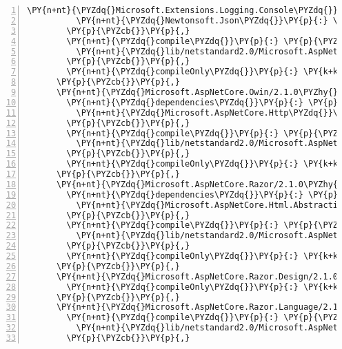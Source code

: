 \begin{Verbatim}[commandchars=\\\{\},numbers=left,firstnumber=1,stepnumber=1,numberblanklines=0]
          \PY{n+nt}{\PYZdq{}Microsoft.Extensions.Logging.Console\PYZdq{}}\PY{p}{:} \PY{l+s+s2}{\PYZdq{}2.1.0\PYZhy{}rc1\PYZhy{}final\PYZdq{}}\PY{p}{,}
          \PY{n+nt}{\PYZdq{}Newtonsoft.Json\PYZdq{}}\PY{p}{:} \PY{l+s+s2}{\PYZdq{}11.0.2\PYZdq{}}
        \PY{p}{\PYZcb{}}\PY{p}{,}
        \PY{n+nt}{\PYZdq{}compile\PYZdq{}}\PY{p}{:} \PY{p}{\PYZob{}}
          \PY{n+nt}{\PYZdq{}lib/netstandard2.0/Microsoft.AspNetCore.NodeServices.dll\PYZdq{}}\PY{p}{:} \PY{p}{\PYZob{}}\PY{p}{\PYZcb{}}
        \PY{p}{\PYZcb{}}\PY{p}{,}
        \PY{n+nt}{\PYZdq{}compileOnly\PYZdq{}}\PY{p}{:} \PY{k+kc}{true}
      \PY{p}{\PYZcb{}}\PY{p}{,}
      \PY{n+nt}{\PYZdq{}Microsoft.AspNetCore.Owin/2.1.0\PYZhy{}rc1\PYZhy{}final\PYZdq{}}\PY{p}{:} \PY{p}{\PYZob{}}
        \PY{n+nt}{\PYZdq{}dependencies\PYZdq{}}\PY{p}{:} \PY{p}{\PYZob{}}
          \PY{n+nt}{\PYZdq{}Microsoft.AspNetCore.Http\PYZdq{}}\PY{p}{:} \PY{l+s+s2}{\PYZdq{}2.1.0\PYZhy{}rc1\PYZhy{}final\PYZdq{}}
        \PY{p}{\PYZcb{}}\PY{p}{,}
        \PY{n+nt}{\PYZdq{}compile\PYZdq{}}\PY{p}{:} \PY{p}{\PYZob{}}
          \PY{n+nt}{\PYZdq{}lib/netstandard2.0/Microsoft.AspNetCore.Owin.dll\PYZdq{}}\PY{p}{:} \PY{p}{\PYZob{}}\PY{p}{\PYZcb{}}
        \PY{p}{\PYZcb{}}\PY{p}{,}
        \PY{n+nt}{\PYZdq{}compileOnly\PYZdq{}}\PY{p}{:} \PY{k+kc}{true}
      \PY{p}{\PYZcb{}}\PY{p}{,}
      \PY{n+nt}{\PYZdq{}Microsoft.AspNetCore.Razor/2.1.0\PYZhy{}rc1\PYZhy{}final\PYZdq{}}\PY{p}{:} \PY{p}{\PYZob{}}
        \PY{n+nt}{\PYZdq{}dependencies\PYZdq{}}\PY{p}{:} \PY{p}{\PYZob{}}
          \PY{n+nt}{\PYZdq{}Microsoft.AspNetCore.Html.Abstractions\PYZdq{}}\PY{p}{:} \PY{l+s+s2}{\PYZdq{}2.1.0\PYZhy{}rc1\PYZhy{}final\PYZdq{}}
        \PY{p}{\PYZcb{}}\PY{p}{,}
        \PY{n+nt}{\PYZdq{}compile\PYZdq{}}\PY{p}{:} \PY{p}{\PYZob{}}
          \PY{n+nt}{\PYZdq{}lib/netstandard2.0/Microsoft.AspNetCore.Razor.dll\PYZdq{}}\PY{p}{:} \PY{p}{\PYZob{}}\PY{p}{\PYZcb{}}
        \PY{p}{\PYZcb{}}\PY{p}{,}
        \PY{n+nt}{\PYZdq{}compileOnly\PYZdq{}}\PY{p}{:} \PY{k+kc}{true}
      \PY{p}{\PYZcb{}}\PY{p}{,}
      \PY{n+nt}{\PYZdq{}Microsoft.AspNetCore.Razor.Design/2.1.0\PYZhy{}rc1\PYZhy{}final\PYZdq{}}\PY{p}{:} \PY{p}{\PYZob{}}
        \PY{n+nt}{\PYZdq{}compileOnly\PYZdq{}}\PY{p}{:} \PY{k+kc}{true}
      \PY{p}{\PYZcb{}}\PY{p}{,}
      \PY{n+nt}{\PYZdq{}Microsoft.AspNetCore.Razor.Language/2.1.0\PYZhy{}rc1\PYZhy{}final\PYZdq{}}\PY{p}{:} \PY{p}{\PYZob{}}
        \PY{n+nt}{\PYZdq{}compile\PYZdq{}}\PY{p}{:} \PY{p}{\PYZob{}}
          \PY{n+nt}{\PYZdq{}lib/netstandard2.0/Microsoft.AspNetCore.Razor.Language.dll\PYZdq{}}\PY{p}{:} \PY{p}{\PYZob{}}\PY{p}{\PYZcb{}}
        \PY{p}{\PYZcb{}}\PY{p}{,}

\end{Verbatim}
